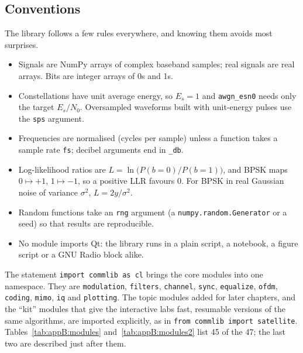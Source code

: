 \subsection{Conventions}

The library follows a few rules everywhere, and knowing them avoids most surprises.
\begin{itemize}[leftmargin=1.5em,itemsep=2pt]
\item Signals are NumPy arrays of complex baseband samples; real signals are real arrays. Bits are
integer arrays of 0s and 1s.
\item Constellations have unit average energy, so $E_s=1$ and \texttt{awgn\_esn0} needs only the
target $E_s/N_0$. Oversampled waveforms built with unit-energy pulses use the \texttt{sps} argument.
\item Frequencies are normalised (cycles per sample) unless a function takes a sample rate
\texttt{fs}; decibel arguments end in \texttt{\_db}.
\item Log-likelihood ratios are $L=\ln\big(P(b=0)/P(b=1)\big)$, and BPSK maps $0\mapsto+1$,
$1\mapsto-1$, so a positive LLR favours 0. For BPSK in real Gaussian noise of variance $\sigma^2$,
$L=2y/\sigma^2$.
\item Random functions take an \texttt{rng} argument (a \texttt{numpy.random.Generator} or a seed) so
that results are reproducible.
\item No module imports Qt: the library runs in a plain script, a notebook, a figure script or a
GNU Radio block alike.
\end{itemize}

The statement \texttt{import commlib as cl} brings the core modules into one namespace. They are
\texttt{modulation}, \texttt{filters}, \texttt{channel}, \texttt{sync}, \texttt{equalize}, \texttt{ofdm},
\texttt{coding}, \texttt{mimo}, \texttt{iq} and \texttt{plotting}. The topic modules added for later
chapters, and the ``kit'' modules that give the interactive labs fast, resumable versions of the
same algorithms, are imported explicitly, as in \texttt{from commlib import satellite}.
Tables~\ref{tab:appB:modules} and~\ref{tab:appB:modules2} list 45 of the 47; the last two are described just after them.

